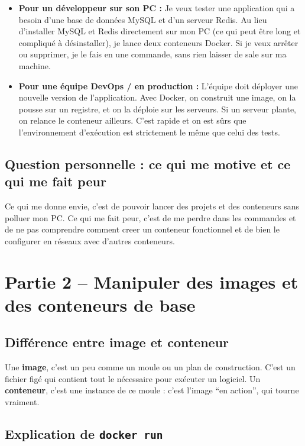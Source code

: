 \documentclass[12pt,a4paper]{article}
\begin{document}
\begin{itemize}
    \item \textbf{Pour un développeur sur son PC :} Je veux tester une application qui a besoin d’une base de données MySQL et d’un serveur Redis. Au lieu d’installer MySQL et Redis directement sur mon PC (ce qui peut être long et compliqué à désinstaller), je lance deux conteneurs Docker. Si je veux arrêter ou supprimer, je le fais en une commande, sans rien laisser de sale sur ma machine.
    \item \textbf{Pour une équipe DevOps / en production :} L’équipe doit déployer une nouvelle version de l’application. Avec Docker, on construit une image, on la pousse sur un registre, et on la déploie sur les serveurs. Si un serveur plante, on relance le conteneur ailleurs. C’est rapide et on est sûrs que l’environnement d’exécution est strictement le même que celui des tests.
\end{itemize}

\subsection{Question personnelle : ce qui me motive et ce qui me fait peur}

 Ce qui me donne envie, c’est de pouvoir lancer des projets et des conteneurs sans polluer mon PC. Ce qui me fait peur, c’est de me perdre dans les commandes et de ne pas comprendre comment creer un conteneur fonctionnel et de bien le configurer en réseaux avec d'autres conteneurs.
\vspace{2cm}

\section{Partie 2 – Manipuler des images et des conteneurs de base}

\subsection{Différence entre image et conteneur}

Une \textbf{image}, c’est un peu comme un moule ou un plan de construction. C’est un fichier figé qui contient tout le nécessaire pour exécuter un logiciel. Un \textbf{conteneur}, c’est une instance de ce moule : c’est l’image “en action”, qui tourne vraiment.

\subsection{Explication de \texttt{docker run}}
\end{document}
